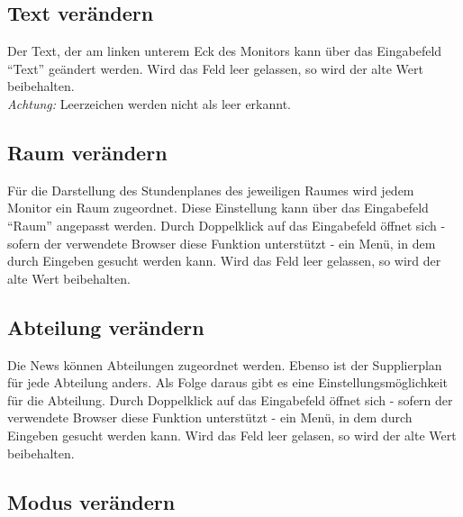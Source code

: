 \subsection{Text verändern}

Der Text, der am linken unterem Eck des Monitors kann über das Eingabefeld \enquote{Text} geändert werden. Wird das Feld leer gelassen, so wird der alte Wert beibehalten.\\
\textit{Achtung:} Leerzeichen werden nicht als leer erkannt.

\subsection{Raum verändern}

Für die Darstellung des Stundenplanes des jeweiligen Raumes wird jedem Monitor ein Raum zugeordnet. Diese Einstellung kann über das Eingabefeld \enquote{Raum} angepasst werden. Durch Doppelklick auf das Eingabefeld öffnet sich - sofern der verwendete Browser diese Funktion unterstützt - ein Menü, in dem durch Eingeben gesucht werden kann. Wird das Feld leer gelassen, so wird der alte Wert beibehalten.

\subsection{Abteilung verändern}

Die News können Abteilungen zugeordnet werden. Ebenso ist der Supplierplan für jede Abteilung anders. Als Folge daraus gibt es eine Einstellungsmöglichkeit für die Abteilung. Durch Doppelklick auf das Eingabefeld öffnet sich - sofern der verwendete Browser diese Funktion unterstützt - ein Menü, in dem durch Eingeben gesucht werden kann. Wird das Feld leer gelasen, so wird der alte Wert beibehalten.

\subsection{Modus verändern}

